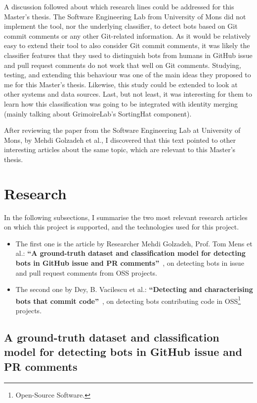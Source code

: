 \documentclass[a4paper, 12pt]{book}
\begin{document}
A discussion followed about which research lines could be addressed for this Master's thesis. The Software Engineering Lab from University of Mons did not implement the tool, nor the underlying classifier, to detect bots based on Git commit comments or any other Git-related information. As it would be relatively easy to extend their tool to also consider Git commit comments, it was likely the classifier features that they used to distinguish bots from humans in GitHub issue and pull request comments do not work that well on Git comments. Studying, testing, and extending this behaviour was one of the main ideas they proposed to me for this Master's thesis. Likewise, this study could be extended to look at other systems and data sources. Last, but not least, it was interesting for them to learn how this classification was going to be integrated with identity merging (mainly talking about GrimoireLab's SortingHat component).

After reviewing the paper from the Software Engineering Lab at University of Mons, by Mehdi Golzadeh et al., I discovered that this text pointed to other interesting articles about the same topic, which are relevant to this Master's thesis.

\section{Research}
\label{sec:research}

In the following subsections, I summarise the two most relevant research articles on which this project is supported, and the technologies used for this project.

\begin{itemize}
    \item The first one is the article by Researcher Mehdi Golzadeh, Prof. Tom Mens et al.: \textbf{``A ground-truth dataset and classification model for detecting bots in GitHub issue and PR comments''}~\cite{golzadeh-mens-ground-truth-github2021}, on detecting bots in issue and pull request comments from OSS projects.
    
    \item The second one by Dey, B. Vacilescu et al.: \textbf{``Detecting and characterising bots that commit code''}~\cite{dey-et-al-detecting-bots}, on detecting bots contributing code in OSS\footnote{Open-Source Software.} projects.
\end{itemize}

\subsection{A ground-truth dataset and classification model for detecting bots in GitHub issue and PR comments}
\label{ssec:golzadeh}
\end{document}
